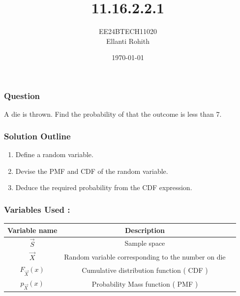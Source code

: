 \documentclass{beamer}
\begin{document}
\title{11.16.2.2.1}
\author{EE24BTECH11020 \\ Ellanti Rohith }
\date{\today}
\frame{\titlepage}

\begin{frame}
\frametitle{Question}
 A die is thrown. Find the probability of that the outcome is less than 7.\\ \end{frame}

\begin{frame}
\frametitle{Solution Outline}
\begin{enumerate}
	\item Define a random variable.
	\item Devise the PMF and CDF of the random variable.
	\item Deduce the required probability from the CDF expression.
\end{enumerate}
\end{frame}

\begin{frame}
\frametitle{Variables Used : }
\begin{center}
\begin{tabular}{|c|c|c|}
\hline 
\textbf{Variable name} & \textbf{Description} \\
\hline 
$\vec{S}$ & Sample space \\
\hline 
$\vec{X}$ & Random variable corresponding to the number on die\\
\hline

$F_{\vec{X}} (x)$ & Cumulative distribution function ( CDF ) \\
\hline
$p_{\vec{X}} (x)$ & Probability Mass function ( PMF ) \\
\hline
\end{tabular}
\end{center}
\end{frame}
\end{document}
